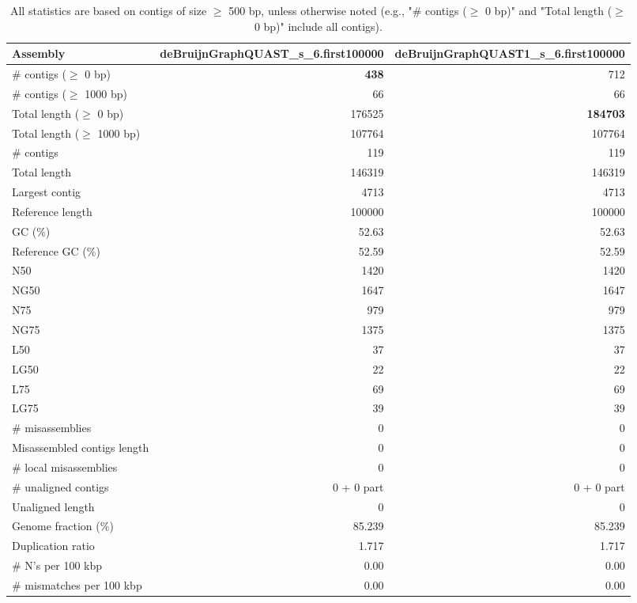 \documentclass[12pt,a4paper]{article}
\begin{document}
\begin{table}[ht]
\begin{center}
\caption{All statistics are based on contigs of size $\geq$ 500 bp, unless otherwise noted (e.g., "\# contigs ($\geq$ 0 bp)" and "Total length ($\geq$ 0 bp)" include all contigs).}
\begin{tabular}{|l*{2}{|r}|}
\hline
Assembly & deBruijnGraphQUAST\_s\_6.first100000 & deBruijnGraphQUAST1\_s\_6.first100000 \\ \hline
\# contigs ($\geq$ 0 bp) & {\bf 438} & 712 \\ \hline
\# contigs ($\geq$ 1000 bp) & 66 & 66 \\ \hline
Total length ($\geq$ 0 bp) & 176525 & {\bf 184703} \\ \hline
Total length ($\geq$ 1000 bp) & 107764 & 107764 \\ \hline
\# contigs & 119 & 119 \\ \hline
Total length & 146319 & 146319 \\ \hline
Largest contig & 4713 & 4713 \\ \hline
Reference length & 100000 & 100000 \\ \hline
GC (\%) & 52.63 & 52.63 \\ \hline
Reference GC (\%) & 52.59 & 52.59 \\ \hline
N50 & 1420 & 1420 \\ \hline
NG50 & 1647 & 1647 \\ \hline
N75 & 979 & 979 \\ \hline
NG75 & 1375 & 1375 \\ \hline
L50 & 37 & 37 \\ \hline
LG50 & 22 & 22 \\ \hline
L75 & 69 & 69 \\ \hline
LG75 & 39 & 39 \\ \hline
\# misassemblies & 0 & 0 \\ \hline
Misassembled contigs length & 0 & 0 \\ \hline
\# local misassemblies & 0 & 0 \\ \hline
\# unaligned contigs & 0 + 0 part & 0 + 0 part \\ \hline
Unaligned length & 0 & 0 \\ \hline
Genome fraction (\%) & 85.239 & 85.239 \\ \hline
Duplication ratio & 1.717 & 1.717 \\ \hline
\# N's per 100 kbp & 0.00 & 0.00 \\ \hline
\# mismatches per 100 kbp & 0.00 & 0.00 \\ \hline

\end{tabular}
\end{center}
\end{table}
\end{document}
